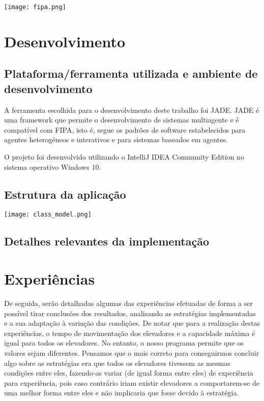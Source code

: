 \documentclass[a4paper]{article}
\begin{document}
\begin{center}
	\texttt{[image: fipa.png]}
\end{center}

\newpage

\section{Desenvolvimento}

\subsection{Plataforma/ferramenta utilizada e ambiente de desenvolvimento} 

A ferramenta escolhida para o desenvolvimento deste trabalho foi JADE. JADE é uma framework que permite o desenvolvimento de sistemas multiagente e é compatível com FIPA, isto é, segue os padrões de software estabelecidos para agentes heterogéneos e interativos e para sistemas baseados em agentes.

O projeto foi desenvolvido utilizando o IntelliJ IDEA Community Edition no sistema operativo Windows 10.

\subsection{Estrutura da aplicação} 

\begin{center}
\hspace*{-3.2cm}
	\texttt{[image: class\_model.png]}\linebreak\linebreak
\end{center}

\subsection{Detalhes relevantes da implementação} 

\newpage

\section{Experiências}

De seguida, serão detalhadas algumas das experiências efetuadas de forma a ser possível tirar conclusões dos resultados, analisando as estratégias implementadas e a sua adaptação à variação das condições. De notar que para a realização destas experiências, o tempo de movimentação dos elevadores e a capacidade máxima é igual para todos os elevadores. No entanto, o nosso programa permite que os valores sejam diferentes. Pensamos que o mais correto para conseguirmos concluir algo sobre as estratégias era que todos os elevadores tivessem as mesmas condições entre eles, fazendo-as variar (de igual forma entre eles) de experiência para experiência, pois caso contrário iriam existir elevadores a comportarem-se de uma melhor forma entre eles e não implicaria que fosse devido à estratégia.
\end{document}
